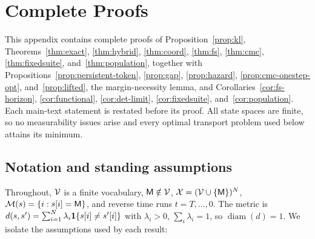 
\section{Complete Proofs}
\label{app:proofs}

This appendix contains complete proofs of Proposition~\ref{prop:kl},
Theorems~\ref{thm:exact}, \ref{thm:hybrid}, \ref{thm:coord}, \ref{thm:fs},
\ref{thm:cmc}, \ref{thm:fixedsuite}, and~\ref{thm:population}, together with
Propositions~\ref{prop:persistent-token}, \ref{prop:gap}, \ref{prop:hazard},
\ref{prop:cmc-onestep-opt}, and~\ref{prop:lifted}, the margin-necessity lemma, and
Corollaries~\ref{cor:fs-horizon}, \ref{cor:functional}, \ref{cor:det-limit},
\ref{cor:fixedsuite}, and~\ref{cor:population}. Each main-text statement is
restated before its proof. All state spaces are finite, so no measurability issues arise and every
optimal transport problem used below attains its minimum.

\subsection{Notation and standing assumptions}
\label{app:proofs:setup}

Throughout, $\mathcal{V}$ is a finite vocabulary, $\mathsf{M}\notin\mathcal{V}$, $\mathcal{X}=(\mathcal{V}\cup\{\mathsf{M}\})^{N}$,
$\mathcal{M}(s)=\{i:s[i]=\mathsf{M}\}$, and reverse time runs $t=T,\dots,0$. The metric is
$d(s,s')=\sum_{i=1}^{N}\lambda_{i}\mathbf{1}\{s[i]\neq s'[i]\}$ with $\lambda_{i}>0$,
$\sum_{i}\lambda_{i}=1$, so $\operatorname{diam}(d)=1$. We isolate the assumptions used by each
result:

